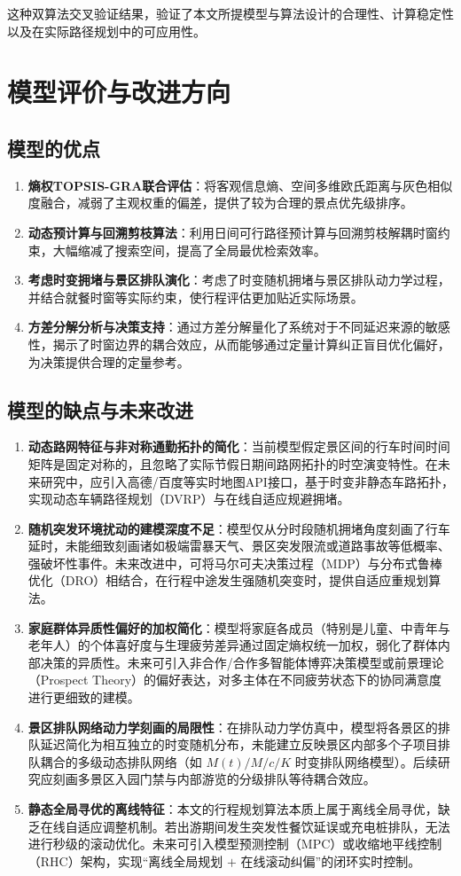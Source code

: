 \documentclass{cumcmthesis}
\begin{document}
这种双算法交叉验证结果，验证了本文所提模型与算法设计的合理性、计算稳定性以及在实际路径规划中的可应用性。

\section{模型评价与改进方向}
\subsection{模型的优点}
\begin{enumerate}
\item \textbf{熵权TOPSIS-GRA联合评估}：将客观信息熵、空间多维欧氏距离与灰色相似度融合，减弱了主观权重的偏差，提供了较为合理的景点优先级排序。
\item \textbf{动态预计算与回溯剪枝算法}：利用日间可行路径预计算与回溯剪枝解耦时窗约束，大幅缩减了搜索空间，提高了全局最优检索效率。
\item \textbf{考虑时变拥堵与景区排队演化}：考虑了时变随机拥堵与景区排队动力学过程，并结合就餐时窗等实际约束，使行程评估更加贴近实际场景。
\item \textbf{方差分解分析与决策支持}：通过方差分解量化了系统对于不同延迟来源的敏感性，揭示了时窗边界的耦合效应，从而能够通过定量计算纠正盲目优化偏好，为决策提供合理的定量参考。
\end{enumerate}

\subsection{模型的缺点与未来改进}
\begin{enumerate}
\item \textbf{动态路网特征与非对称通勤拓扑的简化}：当前模型假定景区间的行车时间时间矩阵是固定对称的，且忽略了实际节假日期间路网拓扑的时空演变特性。在未来研究中，应引入高德/百度等实时地图API接口，基于时变非静态车路拓扑，实现动态车辆路径规划（DVRP）与在线自适应规避拥堵。
\item \textbf{随机突发环境扰动的建模深度不足}：模型仅从分时段随机拥堵角度刻画了行车延时，未能细致刻画诸如极端雷暴天气、景区突发限流或道路事故等低概率、强破坏性事件。未来改进中，可将马尔可夫决策过程（MDP）与分布式鲁棒优化（DRO）相结合，在行程中途发生强随机突变时，提供自适应重规划算法。
\item \textbf{家庭群体异质性偏好的加权简化}：模型将家庭各成员（特别是儿童、中青年与老年人）的个体喜好度与生理疲劳差异通过固定熵权统一加权，弱化了群体内部决策的异质性。未来可引入非合作/合作多智能体博弈决策模型或前景理论（Prospect Theory）的偏好表达，对多主体在不同疲劳状态下的协同满意度进行更细致的建模。
\item \textbf{景区排队网络动力学刻画的局限性}：在排队动力学仿真中，模型将各景区的排队延迟简化为相互独立的时变随机分布，未能建立反映景区内部多个子项目排队耦合的多级动态排队网络（如 $M(t)/M/c/K$ 时变排队网络模型）。后续研究应刻画多景区入园门禁与内部游览的分级排队等待耦合效应。
\item \textbf{静态全局寻优的离线特征}：本文的行程规划算法本质上属于离线全局寻优，缺乏在线自适应调整机制。若出游期间发生突发性餐饮延误或充电桩排队，无法进行秒级的滚动优化。未来可引入模型预测控制（MPC）或收缩地平线控制（RHC）架构，实现“离线全局规划 $+$ 在线滚动纠偏”的闭环实时控制。
\end{enumerate}
\end{document}
